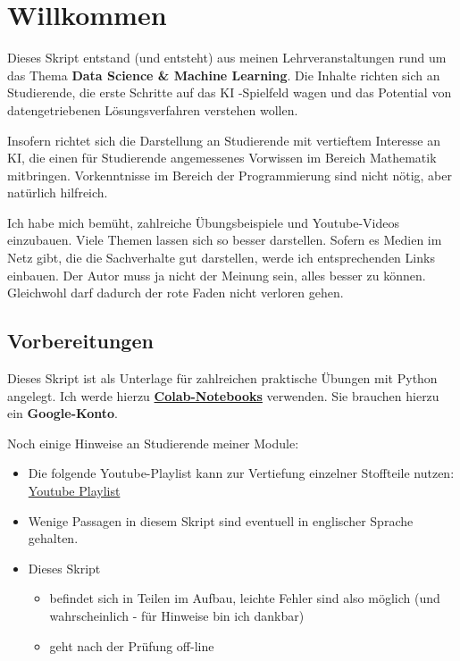 \documentclass[
  oneside]{book}
\providecommand{\tightlist}{%
  \setlength{\itemsep}{0pt}\setlength{\parskip}{0pt}}
\begin{document}
{
\setcounter{tocdepth}{1}
\tableofcontents
}
\hypertarget{willkommen}{%
\chapter*{Willkommen}\label{willkommen}}

Dieses Skript entstand (und entsteht) aus meinen Lehrveranstaltungen rund um das Thema \textbf{Data Science \& Machine Learning}. Die Inhalte richten sich an Studierende, die erste Schritte auf das KI -Spielfeld wagen und das Potential von datengetriebenen Lösungsverfahren verstehen wollen.

Insofern richtet sich die Darstellung an Studierende mit vertieftem Interesse an KI, die einen für Studierende angemessenes Vorwissen im Bereich Mathematik mitbringen. Vorkenntnisse im Bereich der Programmierung sind nicht nötig, aber natürlich hilfreich.

Ich habe mich bemüht, zahlreiche Übungsbeispiele und Youtube-Videos einzubauen. Viele Themen lassen sich so besser darstellen. Sofern es Medien im Netz gibt, die die Sachverhalte gut darstellen, werde ich entsprechenden Links einbauen. Der Autor muss ja nicht der Meinung sein, alles besser zu können. Gleichwohl darf dadurch der rote Faden nicht verloren gehen.

\hypertarget{vorbereitungen}{%
\section{Vorbereitungen}\label{vorbereitungen}}

Dieses Skript ist als Unterlage für zahlreichen praktische Übungen mit Python angelegt. Ich werde hierzu \href{https://colab.research.google.com/}{\textbf{Colab-Notebooks}} verwenden. Sie brauchen hierzu ein \textbf{Google-Konto}.

Noch einige Hinweise an Studierende meiner Module:

\begin{itemize}
\tightlist
\item
  Die folgende Youtube-Playlist kann zur Vertiefung einzelner Stoffteile nutzen: \href{https://youtube.com/playlist?list=PLfGN40VwjduJPvtP9QUjC0rjM6-ePT9bg}{Youtube Playlist}
\item
  Wenige Passagen in diesem Skript sind eventuell in englischer Sprache gehalten.
\item
  Dieses Skript

  \begin{itemize}
  \tightlist
  \item
    befindet sich in Teilen im Aufbau, leichte Fehler sind also möglich (und wahrscheinlich - für Hinweise bin ich dankbar)
  \item
    geht nach der Prüfung off-line
  \end{itemize}
\end{itemize}
\end{document}
